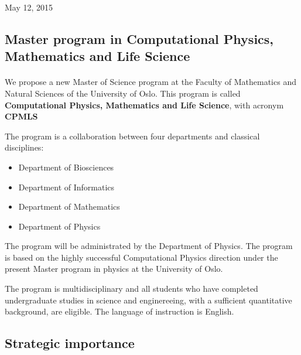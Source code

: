 \documentclass[%
twoside,                 %
final,                   %
10pt]{article}
\begin{document}
\begin{center} %
May 12, 2015
\end{center}

\vspace{1cm}


\subsection*{Master program in Computational Physics, Mathematics and Life Science}

\paragraph{}
We propose a new Master of Science program at the Faculty of Mathematics and Natural Sciences of the University of Oslo. This program is called  \textbf{Computational Physics, Mathematics and Life Science}, with acronym  \textbf{CPMLS} 

The program is a collaboration between four departments and classical disciplines:

\begin{itemize}
 \item Department of Biosciences

 \item Department of Informatics

 \item Department of Mathematics

 \item Department of Physics
\end{itemize}

\noindent
The program will be administrated by the Department of Physics. 
The program is based on the highly successful Computational Physics direction under the present Master program
in physics at the University of Oslo.

The program is multidisciplinary and all students who have completed undergraduate studies in science and enginereeing, with a sufficient quantitative background, are eligible.  The language of instruction is English.



\subsection*{Strategic importance}
\end{document}
